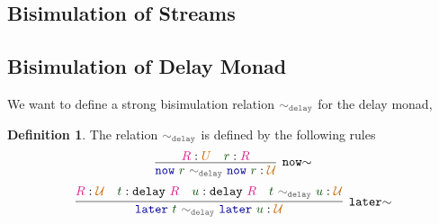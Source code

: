 \documentclass[twoside,11pt,openright]{report}
\theoremstyle{plain} %
\theoremstyle{definition}
\newtheorem{defn}[thm]{Definition}%
\theoremstyle{remark}
\newcommand*{\term}[1]{\textcolor{green!30!black}{#1}} %
\newcommand*{\type}[1]{\textcolor{magenta!90!black}{#1}}
\newcommand*{\universe}[1]{\textcolor{orange!80!black}{#1}}
\newcommand*{\relation}[1]{\textcolor{gray!75!black}{\ensuremath{\mathtt{#1}}}}
\newcommand*{\function}[1]{\textcolor{blue!60!black}{\ensuremath{\mathtt{#1}}}}
\newcommand*{\typeformer}[1]{\ensuremath{\mathtt{#1}}}
\begin{document}
\subsection{Bisimulation of Streams}
\subsection{Bisimulation of Delay Monad}
We want to define a strong bisimulation relation \(\relation{\sim_{delay}}\) for the delay monad, 
\begin{defn}
  The relation \(\relation{\sim_{delay}}\) is defined by the following rules
  \begin{equation}
    \vcenter{\infer[\mathtt{now}{\sim}]{\function{now}~\term{r}~\relation{\sim_{delay}}~\function{now}~\term{r} : \universe{\mathcal{U}}}{\type{R} : \universe{U} & \term{r} : \type{R}}}
  \end{equation}
  \begin{equation}
    \vcenter{\infer[\mathtt{later}{\sim}]{\function{later}~\term{t}~\relation{\sim_{delay}}~\function{later}~\term{u} : \universe{\mathcal{U}}}{\type{R} : \universe{\mathcal{U}} & \term{t} : \typeformer{delay}~\type{R} & \term{u} : \typeformer{delay}~\type{R} & \term{t}~\relation{\sim_{delay}}~\term{u} : \universe{\mathcal{U}}}}
  \end{equation}
\end{defn}
\end{document}
